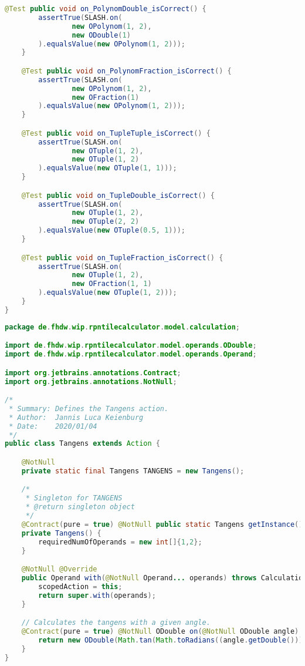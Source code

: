 \begin{lstlisting}[caption=SlashTest (Schwenke),label=list:SlashTest,language=Java]
    @Test public void on_PolynomDouble_isCorrect() {
        assertTrue(SLASH.on(
                new OPolynom(1, 2),
                new ODouble(1)
        ).equalsValue(new OPolynom(1, 2)));
    }

    @Test public void on_PolynomFraction_isCorrect() {
        assertTrue(SLASH.on(
                new OPolynom(1, 2),
                new OFraction(1)
        ).equalsValue(new OPolynom(1, 2)));
    }

    @Test public void on_TupleTuple_isCorrect() {
        assertTrue(SLASH.on(
                new OTuple(1, 2),
                new OTuple(1, 2)
        ).equalsValue(new OTuple(1, 1)));
    }

    @Test public void on_TupleDouble_isCorrect() {
        assertTrue(SLASH.on(
                new OTuple(1, 2),
                new OTuple(2, 2)
        ).equalsValue(new OTuple(0.5, 1)));
    }

    @Test public void on_TupleFraction_isCorrect() {
        assertTrue(SLASH.on(
                new OTuple(1, 2),
                new OFraction(1, 1)
        ).equalsValue(new OTuple(1, 2)));
    }
}
\end{lstlisting}

\begin{lstlisting}[caption=Tangens (Keienburg),label=list:Tangens,language=Java]
package de.fhdw.wip.rpntilecalculator.model.calculation;

import de.fhdw.wip.rpntilecalculator.model.operands.ODouble;
import de.fhdw.wip.rpntilecalculator.model.operands.Operand;

import org.jetbrains.annotations.Contract;
import org.jetbrains.annotations.NotNull;

/*
 * Summary: Defines the Tangens action.
 * Author:  Jannis Luca Keienburg
 * Date:    2020/01/04
 */
public class Tangens extends Action {

    @NotNull
    private static final Tangens TANGENS = new Tangens();

    /*
     * Singleton for TANGENS
     * @return singleton object
     */
    @Contract(pure = true) @NotNull public static Tangens getInstance() { return TANGENS; }
    private Tangens() {
        requiredNumOfOperands = new int[]{1,2};
    }

    @NotNull @Override
    public Operand with(@NotNull Operand... operands) throws CalculationException {
        scopedAction = this;
        return super.with(operands);
    }

    // Calculates the tangens with a given angle.
    @Contract(pure = true) @NotNull ODouble on(@NotNull ODouble angle) {
        return new ODouble(Math.tan(Math.toRadians((angle.getDouble()))));
    }
}
\end{lstlisting}    

